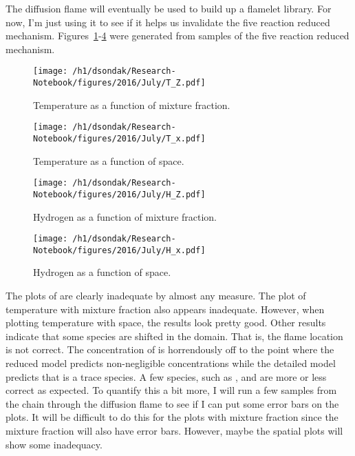 The diffusion flame will eventually be used to build up a flamelet library.  For now, I'm just using it to
see if it helps us invalidate the five reaction reduced mechanism.  Figures~\ref{fig:T_Z}-\ref{fig:H2_x} were generated
from samples of the five reaction reduced mechanism.
\begin{figure}[h!]
  \centering
  \texttt{[image: /h1/dsondak/Research-Notebook/figures/2016/July/T\_Z.pdf]}
  \caption{Temperature as a function of mixture fraction.}
  \label{fig:T_Z}
\end{figure}
\begin{figure}[h!]
  \centering
  \texttt{[image: /h1/dsondak/Research-Notebook/figures/2016/July/T\_x.pdf]}
  \caption{Temperature as a function of space.}
  \label{fig:T_x}
\end{figure}
\begin{figure}[h!]
  \centering
  \texttt{[image: /h1/dsondak/Research-Notebook/figures/2016/July/H\_Z.pdf]}
  \caption{Hydrogen as a function of mixture fraction.}
  \label{fig:H2_Z}
\end{figure}
\begin{figure}[h!]
  \centering
  \texttt{[image: /h1/dsondak/Research-Notebook/figures/2016/July/H\_x.pdf]}
  \caption{Hydrogen as a function of space.}
  \label{fig:H2_x}
\end{figure}
The plots of  are clearly inadequate by almost any measure.  The plot of temperature with
mixture fraction also appears inadequate.  However, when plotting temperature with space, the results
look pretty good.  Other results indicate that some species are shifted in the domain.  That is, 
the flame location is not correct.  The concentration of  is horrendously off to the point
where the reduced model predicts non-negligible concentrations while the detailed model predicts 
that  is a trace species.  A few species, such as ,  and  are more
or less correct as expected.  To quantify this a bit more, I will run a few samples from the chain
through the diffusion flame to see if I can put some error bars on the plots.  It will be difficult
to do this for the plots with mixture fraction since the mixture fraction will also have error bars.
However, maybe the spatial plots will show some inadequacy.

